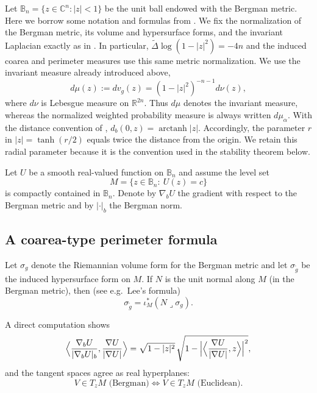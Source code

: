 \documentclass[11pt]{amsart}
\theoremstyle{plain}
\theoremstyle{definition}
\theoremstyle{remark}
\newcommand{\Bn}{\mathbb{B}_n}
\newcommand{\R}{\mathbb{R}}
\newcommand{\C}{\mathbb{C}}
\begin{document}
Let $\Bn=\{z\in\C^n:|z|<1\}$ be the unit ball endowed with the Bergman metric.
Here we borrow some notation and formulas from
\cite{KalajBergman2026Published,KalajBergman2026Arxiv}. We fix the normalization
of the Bergman metric, its volume and hypersurface forms, and the invariant
Laplacian exactly as in \cite{KalajBergman2026Arxiv}. In particular,
$\widetilde\Delta\log(1-|z|^2)=-4n$ and the induced coarea and perimeter
measures use this same metric normalization. We use
the invariant measure already introduced above,
\begin{equation*}\label{eq:bergman_measure_metric}
d\mu(z):=dv_g(z)=(1-|z|^2)^{-n-1}d\nu(z),
\end{equation*}
where $d\nu$ is Lebesgue measure on $\R^{2n}$. Thus $d\mu$ denotes the
invariant measure, whereas the normalized weighted probability measure is
always written $d\mu_\alpha$.
With the distance convention of \cite{KalajBergman2026Arxiv},
$d_b(0,z)=\operatorname{arctanh}|z|$. Accordingly, the parameter $r$ in
$|z|=\tanh(r/2)$ equals twice the distance from the origin. We retain this
radial parameter because it is the convention used in the stability theorem
below.

Let $U$ be a smooth real-valued function on $\Bn$ and assume the level set
\[
M=\{z\in\Bn:\ U(z)=c\}
\]
is compactly contained in $\Bn$. Denote by $\nabla_b U$ the gradient with respect to the Bergman metric and by $|\cdot|_b$ the Bergman norm.

\subsection{A coarea-type perimeter formula}

Let $\sigma_g$ denote the Riemannian volume form for the Bergman metric and let $\sigma_{\tilde g}$ be the induced hypersurface form on $M$. If $N$ is the unit normal along $M$ (in the Bergman metric), then (see e.g.\ Lee's formula)
\begin{equation}\label{eq:tilde_sigma}
\sigma_{\tilde g} = \iota_M^\ast(N\lrcorner \sigma_g).
\end{equation}

A direct computation shows
\begin{equation}\label{eq:formu}
\Bigl\langle \frac{\nabla_b U}{|\nabla_b U|_b}, \frac{\nabla U}{|\nabla U|}\Bigr\rangle
=\sqrt{1-|z|^2}\,\sqrt{1-\Bigl|\Bigl\langle \frac{\nabla U}{|\nabla U|},z\Bigr\rangle\Bigr|^2},
\end{equation}
and the tangent spaces agree as real hyperplanes:
\[
V\in T_zM \text{ (Bergman)}\iff V\in T_zM \text{ (Euclidean)}.
\]
\end{document}
